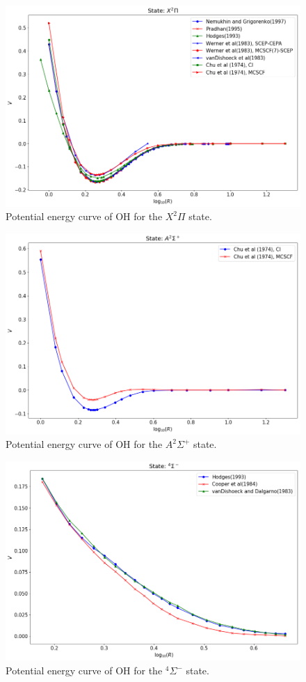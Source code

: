 \documentclass[12pt]{article}
\begin{document}
\iffalse
\begin{figure}[h]
    \centering
    \includegraphics[scale=0.45]{img/OH_X2pi.png}
    \caption{Potential energy curve of OH for the $X^2\Pi$ state.}
    \label{fig:oh1}
\end{figure}
\begin{figure}[h]
    \centering
    \includegraphics[scale=0.45]{img/OH_A2sigmaplus.png}
    \caption{Potential energy curve of OH for the $A^2\Sigma^+$ state.}
    \label{fig:oh2}
\end{figure}
\begin{figure}[h]
    \centering
    \includegraphics[scale=0.45]{img/OH_4sigmaminus.png}
    \caption{Potential energy curve of OH for the $^4\Sigma^-$ state.}
    \label{fig:oh3}
\end{figure}
\end{document}
